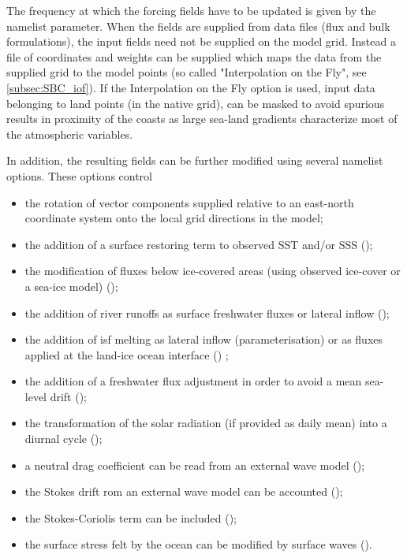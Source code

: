 \documentclass[../tex_main/NEMO_manual]{subfiles}
\begin{document}
The frequency at which the forcing fields have to be updated is given by the  namelist parameter.
When the fields are supplied from data files (flux and bulk formulations),
the input fields need not be supplied on the model grid.
Instead a file of coordinates and weights can be supplied which maps the data from the supplied grid to
the model points (so called "Interpolation on the Fly", see \autoref{subsec:SBC_iof}).
If the Interpolation on the Fly option is used, input data belonging to land points (in the native grid),
can be masked to avoid spurious results in proximity of the coasts as
large sea-land gradients characterize most of the atmospheric variables.

In addition, the resulting fields can be further modified using several namelist options.
These options control 
\begin{itemize}
\item
  the rotation of vector components supplied relative to an east-north coordinate system onto
  the local grid directions in the model;
\item
  the addition of a surface restoring term to observed SST and/or SSS ();
\item
  the modification of fluxes below ice-covered areas (using observed ice-cover or a sea-ice model)
  ();
\item
  the addition of river runoffs as surface freshwater fluxes or lateral inflow ();
\item
  the addition of isf melting as lateral inflow (parameterisation) or
  as fluxes applied at the land-ice ocean interface () ; 
\item
  the addition of a freshwater flux adjustment in order to avoid a mean sea-level drift
  ();
\item
  the transformation of the solar radiation (if provided as daily mean) into a diurnal cycle
  ();
\item
  a neutral drag coefficient can be read from an external wave model ();
\item
  the Stokes drift rom an external wave model can be accounted (); 
\item
  the Stokes-Coriolis term can be included ();
\item
  the surface stress felt by the ocean can be modified by surface waves ().
\end{itemize}
\end{document}

